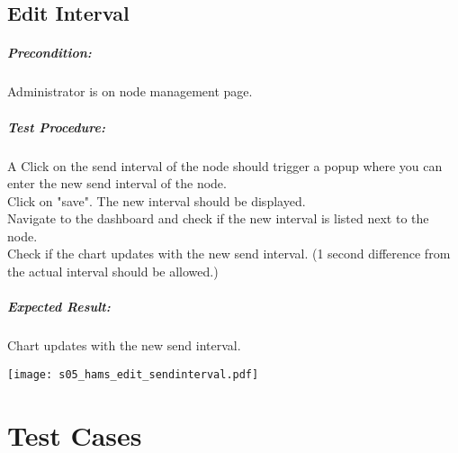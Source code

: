 \documentclass{scrreprt}
\begin{document}
\begin{minipage}[c]{0.4\textwidth}
\section{Edit Interval}

\paragraph{Precondition:}
Administrator is on node management page.\\

\paragraph{Test Procedure:}
A Click on the send interval of the node should trigger a popup where you can enter the new send interval of the node.\\
Click on "save". The new interval should be displayed.\\
Navigate to the dashboard and check if the new interval is listed next to the node.\\
Check if the chart updates with the new send interval. (1 second difference
from the actual interval should be allowed.)\\

\paragraph{Expected Result:}
Chart updates with the new send interval.

\end{minipage}
\hfill
\begin{minipage}[c]{0.5\textwidth}
	\texttt{[image: s05\_hams\_edit\_sendinterval.pdf]}
\end{minipage}


\chapter{Test Cases}
\end{document}
